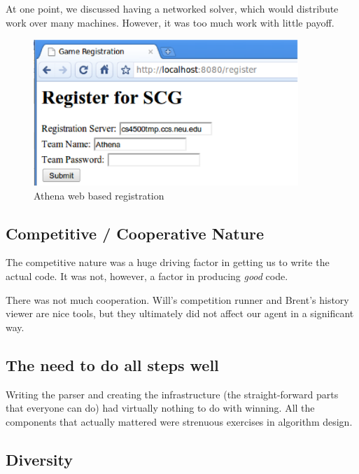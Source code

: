 \documentclass[letterpaper,12pt,oneside]{article}
\begin{document}
At one point, we discussed having a networked solver, which would
distribute work over many machines. However, it was too much work with
little payoff.

\begin{figure}[htp]
\centering
\includegraphics[width=100mm]{registration.eps}
\caption{Athena web based registration}
\label{fig:registration}
\end{figure}

\subsection{Competitive / Cooperative Nature}

The competitive nature was a huge driving factor in getting us to write
the actual code. It was not, however, a factor in producing {\em good}
code.

There was not much cooperation. Will's competition runner and Brent's
history viewer are nice tools, but they ultimately did not affect our
agent in a significant way.

\subsection{The need to do all steps well}

Writing the parser and creating the infrastructure (the straight-forward
parts that everyone can do) had virtually nothing to do with winning. All
the components that actually mattered were strenuous exercises in algorithm
design.

\subsection{Diversity}
% 
\end{document}
